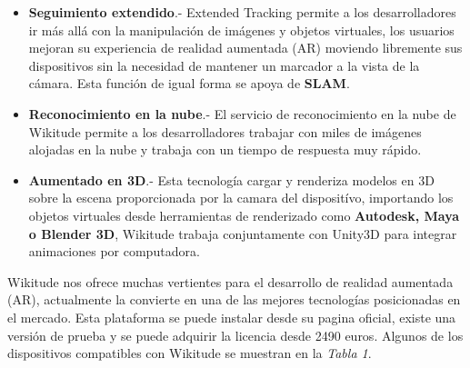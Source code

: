 \begin{itemize}
	\item \textbf{Seguimiento extendido}.- Extended Tracking permite a los desarrolladores ir más allá con la manipulación de imágenes y objetos virtuales, los usuarios mejoran su experiencia de realidad aumentada (AR) moviendo libremente sus dispositivos sin la necesidad de mantener un marcador a la vista de la cámara. Esta función de igual forma se apoya de \textbf{SLAM}. 
	
	\item \textbf{Reconocimiento en la nube}.- El servicio de reconocimiento en la nube de Wikitude permite a los desarrolladores trabajar con miles de imágenes alojadas en la nube y trabaja con un tiempo de respuesta muy rápido.
	
	\item \textbf{Aumentado en 3D}.- Esta tecnología cargar y renderiza modelos en 3D sobre la escena proporcionada por la camara del dispositívo, importando los objetos virtuales desde herramientas de renderizado como \textbf{Autodesk, Maya o Blender 3D}, Wikitude trabaja conjuntamente con Unity3D para integrar animaciones por computadora.\cite{B16}
	
\end{itemize}
\noindent
Wikitude nos ofrece muchas vertientes para el desarrollo de realidad aumentada (AR), actualmente la convierte en una de las mejores tecnologías posicionadas en el mercado. Esta plataforma se puede instalar desde su pagina oficial, existe una versión de prueba y se puede adquirir la licencia desde 2490 euros.\cite{B16} Algunos de los dispositivos compatibles con Wikitude se muestran en la \textit{Tabla 1}.
\newpage
